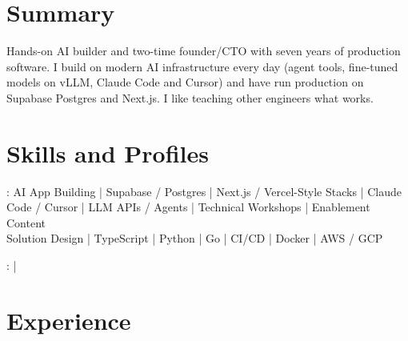 \documentclass[print]{jack-resume}
\begin{document}
\pagecolor{darkmodeBackground}


\begin{minipage}[t][1cm][t]{.03\textwidth}
    \hfill
\end{minipage}

\section{Summary}
Hands-on AI builder and two-time founder/CTO with seven years of production software. I build on modern AI infrastructure every day (agent tools, fine-tuned models on vLLM, Claude Code and Cursor) and have run production on Supabase Postgres and Next.js. I like teaching other engineers what works.
\sectionsep

\section{Skills and Profiles}
:
AI App Building \hfill | \hfill
Supabase / Postgres \hfill | \hfill
Next.js / Vercel-Style Stacks \hfill | \hfill
Claude Code / Cursor \hfill | \hfill
LLM APIs / Agents \hfill | \hfill
Technical Workshops \hfill | \hfill
Enablement Content \\
\hspace{1.0cm} Solution Design \hfill | \hfill
TypeScript \hfill | \hfill
Python \hfill | \hfill
Go \hfill | \hfill
CI/CD \hfill | \hfill
Docker \hfill | \hfill
AWS / GCP \\

\raggedright{
    :
      \href{https://www.linkedin.com/in/jack-sturtevant/}{ \ExternalLink} |
     \href{https://github.com/jacksturt}{ \ExternalLink}}

\section{Experience}
\end{document}
